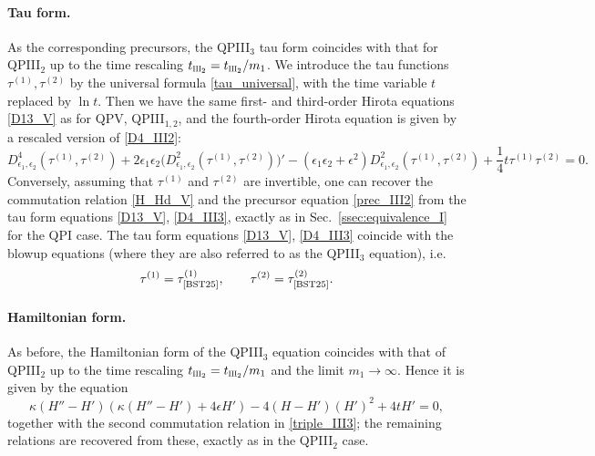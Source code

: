 \documentclass[12pt,a4paper]{article}
\numberwithin{equation}{section}
\newcommand{\III}{\scalebox{.6}{III}}
\begin{document}
\paragraph{Tau form.}
As the corresponding precursors, the QPIII$_3$ tau form coincides with that for QPIII$_2$ up to the time rescaling $t_{\III_2}= t_{\III_2}/m_1$. We introduce the tau functions $\tau^{(1)},\tau^{(2)}$ by the universal formula \eqref{tau_universal}, with the time variable $t$ replaced by $\ln t$. Then we have the same first- and third-order Hirota equations \eqref{D13_V} as for QPV, QPIII$_{1,2}$, and the fourth-order Hirota equation is given by a rescaled version of \eqref{D4_III2}:
\begin{equation}\label{D4_III3}
D^4_{\epsilon_1,\epsilon_2}\left(\tau^{(1)},\tau^{(2)}\right)+2\epsilon_1\epsilon_2\big(D^2_{\epsilon_1,\epsilon_2}\left(\tau^{(1)},\tau^{(2)}\right)\big)'-(\epsilon_1\epsilon_2{+}\epsilon^2)D^2_{\epsilon_1,\epsilon_2}\left(\tau^{(1)},\tau^{(2)}\right)+\frac14t\tau^{(1)}\tau^{(2)}=0.   
\end{equation} 
Conversely, assuming that $\tau^{(1)}$ and $\tau^{(2)}$ are invertible, one can recover the commutation relation \eqref{H_Hd_V} and the precursor equation \eqref{prec_III2} from the tau form equations \eqref{D13_V}, \eqref{D4_III3}, exactly as in Sec.~\ref{ssec:equivalence_I} for the QPI case. 
The tau form equations \eqref{D13_V}, \eqref{D4_III3} coincide with the blowup equations \cite[(3.1),(3.6)]{BST25} (where they are also referred to as the QPIII$_3$ equation), i.e.
\begin{equation}\label{conn_III3}
\tau^{(1)}=\tau^{(1)}_{\textrm{\cite{BST25}}}, \qquad \tau^{(2)}=\tau^{(2)}_{\textrm{\cite{BST25}}}.    
\end{equation}

\paragraph{Hamiltonian form.}
As before, the Hamiltonian form of the QPIII$_3$ equation coincides with that of QPIII$_2$ up to the time rescaling $t_{\III_2}= t_{\III_2}/m_1$ and the limit $m_1\rightarrow\infty$. Hence it is given by the equation
\begin{equation}
\label{Ham_III3_twisted}
\kappa(H''-H')(\kappa(H''-H')+4\epsilon H')-4(H-H')(H')^2+4tH'=0,
\end{equation}
together with the second commutation relation in \eqref{triple_III3}; the remaining relations are recovered from these, exactly as in the QPIII$_2$ case. 
\end{document}
